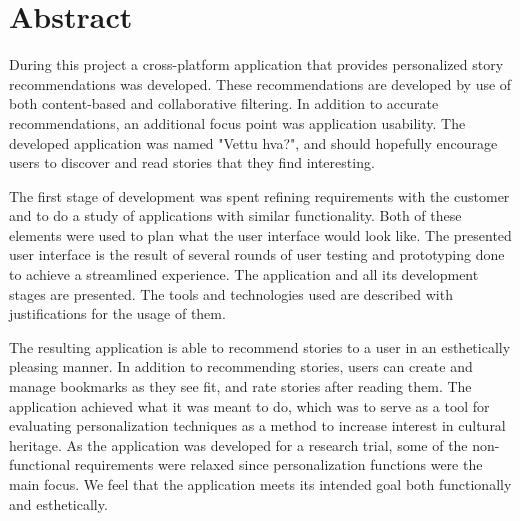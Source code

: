 \section*{\Huge Abstract}

During this project a cross-platform application that provides personalized story 
recommendations was developed. These recommendations are developed by use of both 
content-based and collaborative filtering. In addition to accurate recommendations, 
an additional focus point was application usability. 
The developed application was named "Vettu hva?", and should hopefully 
encourage users to discover and read stories that they find interesting.\newline

The first stage of development was spent refining requirements with the 
customer and to do a study of applications with similar functionality. 
Both of these elements were used to plan what the user interface would look like. 
The presented user interface is the result of several rounds of user testing and 
prototyping done to achieve a streamlined experience. The application and all its 
development stages are presented. The tools and technologies used are described with 
justifications for the usage of them.\newline 

The resulting application is able to recommend stories to a user in an esthetically 
pleasing manner. In addition to recommending stories, users can create and manage 
bookmarks as they see fit, and rate stories after reading them. The application 
achieved what it was meant to do, which was to serve as a tool for evaluating 
personalization techniques as a method to increase interest in cultural heritage. 
As the application was developed for a research trial, some of the non-functional 
requirements were relaxed since personalization functions were the main focus. 
We feel that the application meets its intended goal both functionally and esthetically.\newline

\cleardoublepage
